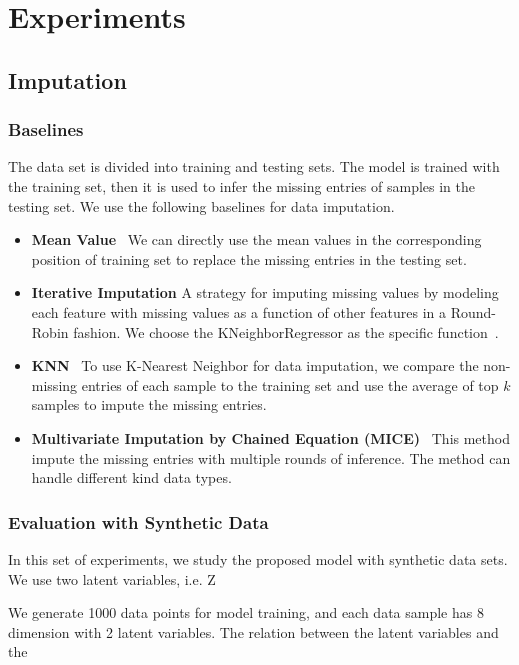 \documentclass{article} %
\begin{document}
\section{Experiments}


\subsection{Imputation}

\subsubsection{Baselines}
The data set is divided into training and testing sets. The model is trained with the training set, then it is used to infer the missing entries of samples in the testing set. We use the following baselines for data imputation.

\begin{itemize}
\item \textbf{Mean Value} \ We can directly use the mean values in the corresponding position of training set to replace the missing entries in the testing set.  

\item \textbf{Iterative Imputation} A strategy for imputing missing values by modeling each feature with missing values as a function of other features in a Round-Robin fashion. We choose the KNeighborRegressor as the specific function~\cite{scikit-learn}.

\item \textbf{KNN} \  To use K-Nearest Neighbor for data imputation,  we compare the non-missing entries of each sample to the training set and use the  average of top $k$ samples to impute the missing entries. 

\item \textbf{Multivariate Imputation by Chained Equation (MICE)} \ This method impute the missing entries with multiple  rounds of inference. The method can handle different kind data types.
\end{itemize}

\subsubsection{Evaluation with Synthetic Data  }
In this set of experiments, we study the proposed model with synthetic data sets.
We use two latent variables, i.e. Z

We generate 1000 data points for model training, and each data sample  has 8 dimension with 2 latent variables.  The relation between the latent variables and the 
\end{document}
